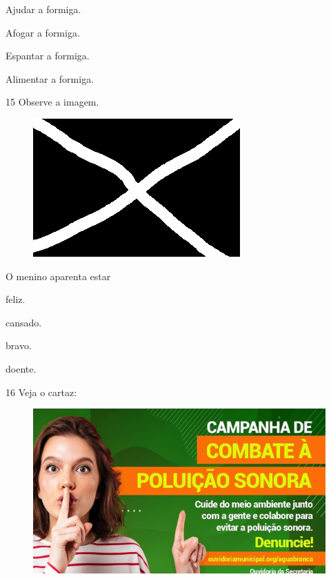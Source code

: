 \begin{multicols}{2}
\begin{escolha}
\item Ajudar a formiga.

\item Afogar a formiga.

\item Espantar a formiga.

\item Alimentar a formiga.
\end{escolha}
\end{multicols}

\pagebreak
\num{15} Observe a imagem.

\begin{figure}[htpb!]
\centering
\includegraphics[width=.65\textwidth]{media/confederados.png}
\end{figure}

O menino aparenta estar

\begin{multicols}{2}
\begin{escolha}
\item feliz.

\item cansado.

\item bravo.

\item doente.
\end{escolha}
\end{multicols}
\num{16} Veja o cartaz:

\begin{figure}[htpb!]
\centering
\includegraphics[width=.65\textwidth]{media/image173.png}
\end{figure}

